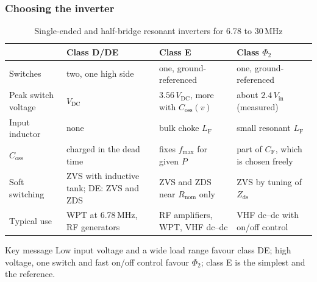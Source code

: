 \begin{frame}
	\frametitle{Choosing the inverter}
	\begin{table}
		\centering
		\scriptsize
		\begin{tabular}{|l|>{\raggedright\arraybackslash}p{3.4cm}|>{\raggedright\arraybackslash}p{3.4cm}|>{\raggedright\arraybackslash}p{3.4cm}|}
			\hline
			                     & \textbf{Class D/DE}                 & \textbf{Class E}                              & \textbf{Class $\Phi_2$}                   \\
			\hline
			Switches             & two, one high side                  & one, ground-referenced                        & one, ground-referenced                    \\
			Peak switch voltage  & $V_\mathrm{DC}$                     & $3.56\,V_\mathrm{DC}$, more with $C_\mathrm{oss}(v)$ & about $2.4\,V_\mathrm{in}$ (measured) \\
			Input inductor       & none                                & bulk choke $L_\mathrm{F}$                     & small resonant $L_\mathrm{F}$             \\
			$C_\mathrm{oss}$     & charged in the dead time            & fixes $f_\mathrm{max}$ for given $P$          & part of $C_\mathrm{F}$, which is chosen freely             \\
			Soft switching       & ZVS with inductive tank; DE: ZVS and ZDS & ZVS and ZDS near $R_\mathrm{nom}$ only   & ZVS by tuning of $Z_\mathrm{ds}$          \\
			Typical use          & WPT at 6.78\,MHz, RF generators     & RF amplifiers, WPT, VHF dc--dc                & VHF dc--dc with on/off control            \\
			\hline
		\end{tabular}
		\caption{Single-ended and half-bridge resonant inverters for 6.78 to 30\,MHz}
	\end{table}
	\begin{block}{Key message}
		Low input voltage and a wide load range favour class DE; high voltage, one switch and fast on/off control favour $\Phi_2$; class E is the simplest and the reference.
	\end{block}
\end{frame}


